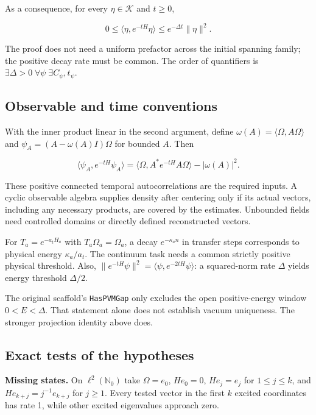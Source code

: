 \documentclass[
  11pt,
  letterpaper,
]{article}
\begin{document}
As a consequence, for every \(\eta\in\mathscr K\) and \(t\ge0\),

\[
0\le\langle\eta,e^{-tH}\eta\rangle
\le e^{-\Delta t}\|\eta\|^2.
\]

The proof does not need a uniform prefactor across the initial spanning
family; the positive decay rate must be common. The order of quantifiers
is \(\exists\Delta>0\;\forall\psi\;\exists C_\psi,t_\psi\).

\subsection{Observable and time
conventions}\label{observable-and-time-conventions}

With the inner product linear in the second argument, define
\(\omega(A)=\langle\Omega,A\Omega\rangle\) and
\(\psi_A=(A-\omega(A)I)\Omega\) for bounded \(A\). Then

\[
\langle\psi_A,e^{-tH}\psi_A\rangle
=\langle\Omega,A^*e^{-tH}A\Omega\rangle-|\omega(A)|^2.
\]

These positive connected temporal autocorrelations are the required
inputs. A cyclic observable algebra supplies density after centering
only if its actual vectors, including any necessary products, are
covered by the estimates. Unbounded fields need controlled domains or
directly defined reconstructed vectors.

For \(T_a=e^{-a_tH_a}\) with \(T_a\Omega_a=\Omega_a\), a decay
\(e^{-\kappa_a n}\) in transfer steps corresponds to physical energy
\(\kappa_a/a_t\). The continuum task needs a common strictly positive
physical threshold. Also,
\(\|e^{-tH}\psi\|^2=\langle\psi,e^{-2tH}\psi\rangle\): a squared-norm
rate \(\Delta\) yields energy threshold \(\Delta/2\).

The original scaffold's \texttt{HasPVMGap} only excludes the open
positive-energy window \(0<E<\Delta\). That statement alone does not
establish vacuum uniqueness. The stronger projection identity above
does.

\subsection{Exact tests of the
hypotheses}\label{exact-tests-of-the-hypotheses}

\textbf{Missing states.} On \(\ell^2(\mathbb N_0)\) take \(\Omega=e_0\),
\(He_0=0\), \(He_j=e_j\) for \(1\le j\le k\), and
\(He_{k+j}=j^{-1}e_{k+j}\) for \(j\ge1\). Every tested vector in the
first \(k\) excited coordinates has rate 1, while other excited
eigenvalues approach zero.
\end{document}

